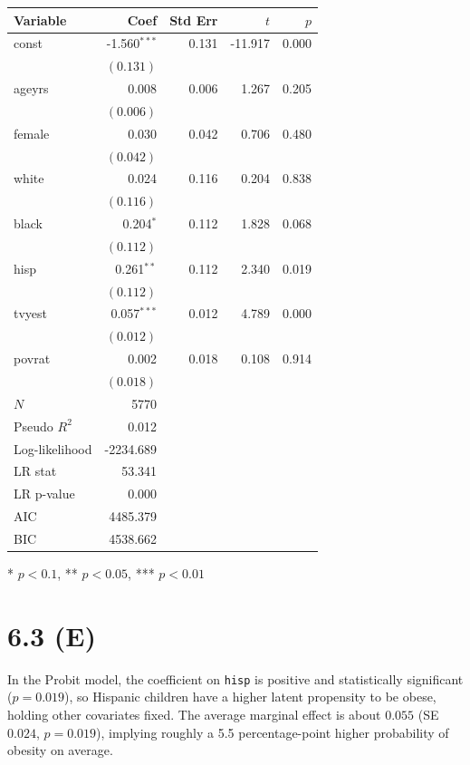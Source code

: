 \documentclass{article}
\begin{document}
\renewcommand{\arraystretch}{1.1}
\setlength{\tabcolsep}{6pt}
\begin{table}[H]
\centering
\begin{tabular}{lrrrr}
\hline
Variable & Coef & Std Err & $t$ & $p$ \\
\hline
const & -1.560$^{\ast\ast\ast}$ & 0.131 & -11.917 & 0.000 \\
 & $(0.131)$ & & & \\
ageyrs & 0.008 & 0.006 & 1.267 & 0.205 \\
 & $(0.006)$ & & & \\
female & 0.030 & 0.042 & 0.706 & 0.480 \\
 & $(0.042)$ & & & \\
white & 0.024 & 0.116 & 0.204 & 0.838 \\
 & $(0.116)$ & & & \\
black & 0.204$^{\ast}$ & 0.112 & 1.828 & 0.068 \\
 & $(0.112)$ & & & \\
hisp & 0.261$^{\ast\ast}$ & 0.112 & 2.340 & 0.019 \\
 & $(0.112)$ & & & \\
tvyest & 0.057$^{\ast\ast\ast}$ & 0.012 & 4.789 & 0.000 \\
 & $(0.012)$ & & & \\
povrat & 0.002 & 0.018 & 0.108 & 0.914 \\
 & $(0.018)$ & & & \\
\hline
$N$ & 5770 & & & \\
Pseudo $R^2$ & 0.012 & & & \\
Log-likelihood & -2234.689 & & & \\
LR stat & 53.341 & & & \\
LR p-value & 0.000 & & & \\
AIC & 4485.379 & & & \\
BIC & 4538.662 & & & \\
\hline
\end{tabular}
\end{table}
\vspace{2pt}
\begin{flushleft}\footnotesize{* $p<0.1$, ** $p<0.05$, *** $p<0.01$}\end{flushleft}

\clearpage
\section*{6.3 (E)}

﻿\noindent In the Probit model, the coefficient on \texttt{hisp} is positive and statistically significant (\(p=0.019\)), so Hispanic children have a higher latent propensity to be obese, holding other covariates fixed. The average marginal effect is about \(0.055\) (SE \(0.024\), \(p=0.019\)), implying roughly a 5.5 percentage-point higher probability of obesity on average.
\end{document}
